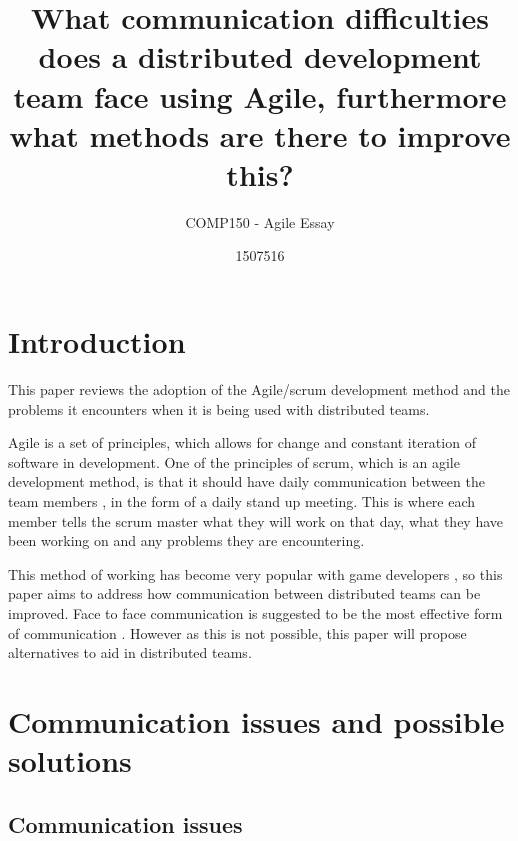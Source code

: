 \documentclass{scrartcl}
\title{What communication difficulties does a distributed development team face using Agile, furthermore what methods are there to improve this?}
\subtitle{COMP150 - Agile Essay}
\author{1507516}
\begin{document}
\maketitle


\section{Introduction}

This paper reviews the adoption of the Agile/scrum development method and the problems it encounters when it is being used with distributed teams.

Agile is a set of principles, which allows for change and constant iteration of software in development. One of the principles of scrum, which is an agile development method, is that it should have daily communication between the team members \cite{abdullah2011}, in the form of a daily stand up meeting. This is where each member tells the scrum master what they will work on that day, what they have been working on and any problems they are encountering. 

This method of working has become very popular with game developers \cite{campbell2016}, so this paper aims to address how communication between distributed teams can be improved. 
Face to face communication is suggested to be the most effective form of communication \cite{joshi2013}. However as this is not possible, this paper will propose alternatives to aid in distributed teams.









\section{Communication issues and possible solutions}
\subsection{Communication issues}
\end{document}
